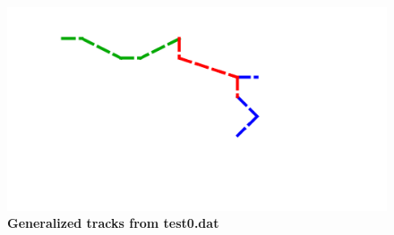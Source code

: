 \begin{figure}[!ht]
\begin{center}
 \includegraphics[scale=0.5]{./graphics/gtrack.png}
\end{center}
\caption{{\bf Generalized tracks from test0.dat}}
\label{Figure2}
\end{figure}

